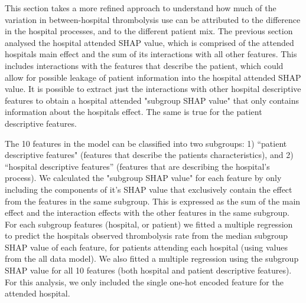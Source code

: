 This section takes a more refined approach to understand how much of the variation in between-hospital thrombolysis use can be attributed to the difference in the hospital processes, and to the different patient mix. The previous section analysed the hospital attended SHAP value, which is comprised of the attended hospitals main effect and the sum of its interactions with all other features. This includes interactions with the features that describe the patient, which could allow for possible leakage of patient information into the hospital attended SHAP value. It is possible to extract just the interactions with other hospital descriptive features to obtain a hospital attended "subgroup SHAP value" that only contains information about the hospitals effect. The same is true for the patient descriptive features.

The 10 features in the model can be classified into two subgroups: 1) “patient descriptive features" (features that describe the patients characteristics), and 2) “hospital descriptive features” (features that are describing the hospital’s process). We calculated the "subgroup SHAP value" for each feature by only including the components of it's SHAP value that exclusively contain the effect from the features in the same subgroup. This is expressed as the sum of the main effect and the interaction effects with the other features in the same subgroup. For each subgroup features (hospital, or patient) we fitted a multiple regression to predict the hospitals observed thrombolysis rate from the median subgroup SHAP value of each feature, for patients attending each hospital (using values from the all data model). We also fitted a multiple regression using the subgroup SHAP value for all 10 features (both hospital and patient descriptive features). For this analysis, we only included the single one-hot encoded feature for the attended hospital. 


